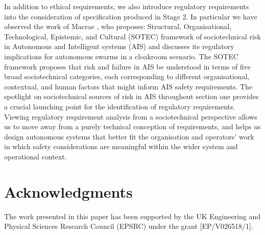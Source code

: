 \documentclass[runningheads]{llncs}
\begin{document}
In addition to ethical requirements, we also introduce regulatory requirements into the consideration of specification produced in Stage 2.
In particular we have observed the work of Macrae \cite{macrae2021learning}, who proposes: Structural, Organisational, Technological, Epistemic, and Cultural (SOTEC) framework of sociotechnical risk in Autonomous and Intelligent systems (AIS) and discusses its regulatory implications for autonomous swarms in a cloakroom scenario. The SOTEC framework proposes that risk and failure in AIS be understood in terms of five broad sociotechnical categories, each corresponding to different organisational, contextual, and human factors that might inform AIS safety requirements. The spotlight on sociotechnical sources of risk in AIS throughout section one provides a crucial launching point for the identification of regulatory requirements. Viewing regulatory requirement analysis from a sociotechnical perspective allows us to move away from a purely technical conception of requirements, and helps us design autonomous systems that better fit the organisation and operators’ work in which safety considerations are meaningful within the wider system and operational context. 

\section*{Acknowledgments}
The work presented in this paper has been supported by the UK Engineering and Physical Sciences Research Council (EPSRC) under the grant [EP/V026518/1].

%
%
%
\scriptsize

%
\end{document}
